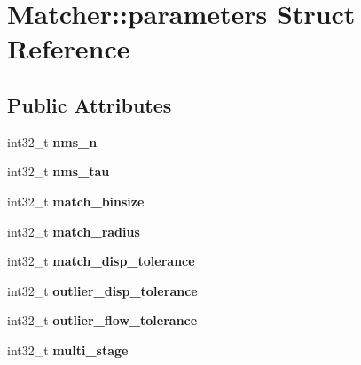\hypertarget{struct_matcher_1_1parameters}{\section{Matcher\+:\+:parameters Struct Reference}
\label{struct_matcher_1_1parameters}
}
\subsection*{Public Attributes}
\begin{DoxyCompactItemize}
\item 
\hypertarget{struct_matcher_1_1parameters_a9820e6e263d60c483af5841d13098401}{int32\+\_\+t {\bfseries nms\+\_\+n}}\label{struct_matcher_1_1parameters_a9820e6e263d60c483af5841d13098401}

\item 
\hypertarget{struct_matcher_1_1parameters_a16b40f28d3bf50ae8a7a83975fa14c07}{int32\+\_\+t {\bfseries nms\+\_\+tau}}\label{struct_matcher_1_1parameters_a16b40f28d3bf50ae8a7a83975fa14c07}

\item 
\hypertarget{struct_matcher_1_1parameters_a48379ecc77592481cd6d00af670b59bb}{int32\+\_\+t {\bfseries match\+\_\+binsize}}\label{struct_matcher_1_1parameters_a48379ecc77592481cd6d00af670b59bb}

\item 
\hypertarget{struct_matcher_1_1parameters_a16a9accda09c16eb650a1b2b7a629625}{int32\+\_\+t {\bfseries match\+\_\+radius}}\label{struct_matcher_1_1parameters_a16a9accda09c16eb650a1b2b7a629625}

\item 
\hypertarget{struct_matcher_1_1parameters_a5166550b921eface419dbf8470c2aec4}{int32\+\_\+t {\bfseries match\+\_\+disp\+\_\+tolerance}}\label{struct_matcher_1_1parameters_a5166550b921eface419dbf8470c2aec4}

\item 
\hypertarget{struct_matcher_1_1parameters_a0595f0b135ef4aa2dbf41b5327c35da5}{int32\+\_\+t {\bfseries outlier\+\_\+disp\+\_\+tolerance}}\label{struct_matcher_1_1parameters_a0595f0b135ef4aa2dbf41b5327c35da5}

\item 
\hypertarget{struct_matcher_1_1parameters_afc412d3892d9a58ce9594dd0156e084d}{int32\+\_\+t {\bfseries outlier\+\_\+flow\+\_\+tolerance}}\label{struct_matcher_1_1parameters_afc412d3892d9a58ce9594dd0156e084d}

\item 
\hypertarget{struct_matcher_1_1parameters_a62fe233d2ac12916133be544ec85f763}{int32\+\_\+t {\bfseries multi\+\_\+stage}}\label{struct_matcher_1_1parameters_a62fe233d2ac12916133be544ec85f763}


\end{DoxyCompactItemize}

